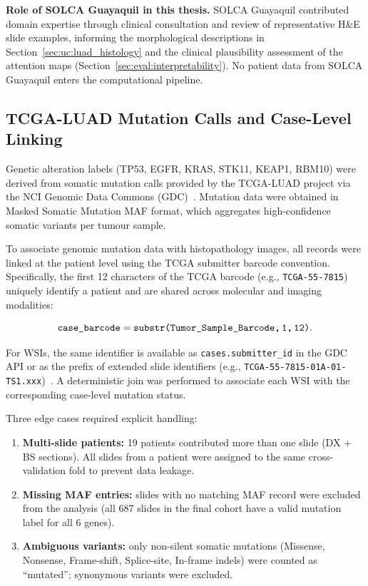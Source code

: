 \textbf{Role of SOLCA Guayaquil in this thesis.}
SOLCA Guayaquil contributed domain expertise through clinical consultation and
review of representative H\&E slide examples, informing the
morphological descriptions in Section~\ref{sec:uc:luad_histology} and
the clinical plausibility assessment of the attention maps
(Section~\ref{sec:eval:interpretability}).
No patient data from SOLCA Guayaquil enters the computational pipeline.


\subsection{TCGA-LUAD Mutation Calls and Case-Level Linking}
\label{subsec:tcga_mutations_linking}

Genetic alteration labels (TP53, EGFR, KRAS, STK11, KEAP1, RBM10) were
derived from somatic mutation calls provided by the TCGA-LUAD project
via the NCI Genomic Data Commons (GDC)~\cite{gdc2024maf}.
Mutation data were obtained in Masked Somatic Mutation MAF format, which
aggregates high-confidence somatic variants per tumour sample.

To associate genomic mutation data with histopathology images, all
records were linked at the patient level using the TCGA submitter barcode
convention.
Specifically, the first 12 characters of the TCGA barcode
(e.g., \texttt{TCGA-55-7815}) uniquely identify a patient and are shared
across molecular and imaging modalities:

\begin{equation}
\label{eq:barcode_linking}
\texttt{case\_barcode} = \texttt{substr(Tumor\_Sample\_Barcode,\,1,\,12)}.
\end{equation}

For WSIs, the same identifier is available as
\texttt{cases.submitter\_id} in the GDC API or as the prefix of extended
slide identifiers (e.g.,
\texttt{TCGA-55-7815-01A-01-TS1.xxx})~\cite{gdc2024maf}.
A deterministic join was performed to associate each WSI with the
corresponding case-level mutation status.

Three edge cases required explicit handling:
\begin{enumerate}
    \item \textbf{Multi-slide patients:} 19 patients contributed more
    than one slide (DX + BS sections). All slides from a patient were
    assigned to the same cross-validation fold to prevent data leakage.

    \item \textbf{Missing MAF entries:} slides with no matching MAF
    record were excluded from the analysis (all 687 slides in the
    final cohort have a valid mutation label for all 6 genes).

    \item \textbf{Ambiguous variants:} only non-silent somatic mutations
    (Missense, Nonsense, Frame-shift, Splice-site, In-frame indels) were
    counted as ``mutated''; synonymous variants were excluded.
\end{enumerate}

